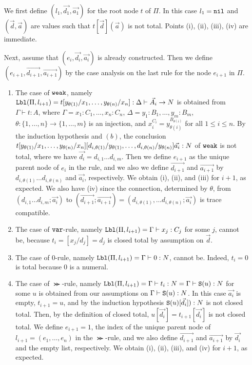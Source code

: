 \documentclass{article}
\newenvironment{proof}[1][Proof]{\begin{trivlist}
\item[\hskip \labelsep {\bfseries #1}]}{\end{trivlist}}
\begin{document}
\begin{proof}
  We first define $(l_1,\vec{d_1},\vec{a_1})$ for the root node $t$ of $\Pi$.
  In this case $l_1 = {\tt nil}$ 
   and $(\vec{d},\vec{a})$ are values such that $t[\vec{d}](\vec{a})$ is not total.
  Points (i), (ii), (iii), (iv) are immediate.

  Next, assume that $(e_i,\vec{d_i},\vec{a_i})$ is already constructed.
  Then we define $(e_{i+1},\vec{d_{i+1}},\vec{a_{i+1}})$ by the case analysis on
  the last rule for the node $e_{i+1}$ in $\Pi$. 


\begin{enumerate}
\item
  The case of ${\tt weak}$, namely
  ${\tt Lbl}(\Pi,l_{i+1}) = t[y_{\theta (1)}/x_1,\ldots,y_{\theta (n)}/x_n]:\Delta\vdash \vec{A_i}\rightarrow{N}$
  is obtained from $\Gamma\vdash t:A$, where
  $\Gamma = x_1:C_1,\ldots,x_n:C_n$, $\Delta = y_1:B_1,\ldots,y_m:B_m$, 
  $\theta:\{1,\ldots,n\}\to\{1,\ldots,m\}$ is an injection, 
  and $x_i^{C_i}=y_{\theta(i)}^{B_{\theta(i)}}$ for all $1\le i\le n$.
  By the induction hypothesis and $(b)$, the conclusion
  $t[y_{\theta (1)}/x_1,\ldots,y_{\theta (n)}/x_n][d_{i,\theta (1)}/y_{\theta (1)},\ldots,d_{i,\theta (n)}/y_{\theta (n)}]\vec{a_i}:{N}$ 
  of ${\tt weak}$ is not total, where we have $\vec{d_i} = d_{i,1}\ldots d_{i,m}$.
  Then we define $e_{i+1}$ as the unique parent node of $e_i$ in the rule, and we
  also we define $\vec{d_{i+1}}$ and $\vec{a_{i+1}}$ by $d_{i,\theta (1)}\ldots d_{i,\theta (n)}$
  and $\vec{a_i}$, respectively. 
  We obtain (i), (ii), and (iii) for $i+1$, as expected.
  We also have (iv) since the connection, determined by $\theta $, from
  $(d_{i,1}\ldots d_{i,m};\vec{a_i})$ to 
  $(\vec{d_{i+1}};\vec{a_{i+1}}) = (d_{i,\theta (1)},\ldots d_{i,\theta (n)};\vec{a_i})$
  is trace compatible. 

\item
  The case of ${\tt var}$-rule, namely ${\tt Lbl}(\Pi,l_{i+1}) = \Gamma\vdash x_j:C_j$ for some $j$, 
cannot be, because $t_i = [x_j/d_j] = d_j$ is closed total by assumption on $\vec{d}$.

\item
  The case of $0$-rule, namely ${\tt Lbl}(\Pi,l_{i+1}) = \Gamma\vdash 0:{N}$, 
cannot be. Indeed, $t_i = 0$ is total because $0$ is a numeral.

\item  
  The case of $\Succ$-rule, namely ${\tt Lbl}(\Pi,l_{i+1}) = 
  \Gamma\vdash t_i: {N} = \Gamma\vdash {\tt S}(u): {N}$ for some $u$ 
  is obtained from our assumptions on
  $\Gamma\vdash {\tt S}(u): {N}$. In this case $\vec{a_i}$ is empty, $t_{i+1}=u$, and
  by the induction hypothesis ${\tt S}(u)[\vec{d_i}]):{N}$ is not closed total.
  Then, by the definition of closed total, $u[\vec{d_i}] =t_{i+1}[\vec{d_i}] $ is not closed total. 
  We define $e_{i+1}=1$, 
  the index of the unique parent node of $l_{i+1}=(e_1, \ldots, e_n)$ in the $\Succ$-rule, and
  we also define $\vec{d_{i+1}}$ and $\vec{a_{i+1}}$ by $\vec{d_i}$ and the empty list, respectively. 
  We obtain (i), (ii), (iii), and (iv) for $i+1$, as expected.


\end{enumerate}
\end{proof}
\end{document}
